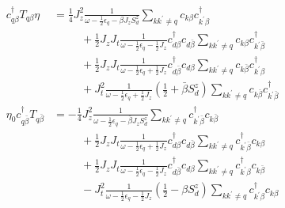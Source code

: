 \documentclass[14pt]{extarticle}
\numberwithin{equation}{section}
\begin{document}
\begin{align}
  c^{\dag}_{q\beta}T_{q\beta}\eta  &=  \frac{1}{4} J_z^2 \frac{1}{\omega - \frac{1}{2} \epsilon_q - \beta J_zS_d^z}  \sum\limits_{kk^{\prime}\ne q} c_{k\beta}c^{\dag}_{k^{\prime}\beta} \nonumber\\
&\hspace{30pt} + \frac{1}{2} J_z J_t\frac{1}{\omega - \frac{1}{2}\epsilon_q - \frac{1}{2}J_z}  c^{\dag}_{d\beta} c_{d\bar{\beta}} \sum\limits_{kk^{\prime}\ne q}  c_{k\beta} c^{\dag}_{k^{\prime}\bar{\beta}} \nonumber\\
&\hspace{30pt} +   \frac{1}{2} J_z J_t\frac{1}{\omega - \frac{1}{2}\epsilon_q + \frac{1}{2}J_z} c^{\dag}_{d\bar{\beta}} c_{d\beta} \sum\limits_{kk^{\prime}\ne q}  c_{k\bar{\beta}}  c^{\dag}_{k^{\prime}\beta} \nonumber\\
&\hspace{30pt} + J_t^2 \frac{1}{\omega - \frac{1}{2}\epsilon_q + \frac{1}{2} J_z} \left( \frac{1}{2} + \bar{\beta} S_d^z \right) \sum\limits_{kk^{\prime}\ne q} c_{k\bar{\beta}} c^{\dag}_{k^{\prime}\bar{\beta}} \label{eq:36} \\
  \eta_0 c^{\dag}_{q\bar{\beta}}T_{q\bar{\beta}} &= -\frac{1}{4} J_z^2 \frac{1}{\omega - \frac{1}{2} \epsilon_q -\bar{\beta} J_zS^z_d }  \sum\limits_{kk^{\prime}\ne q} c^{\dag}_{k^{\prime}\bar{\beta}} c_{k\bar{\beta}} \nonumber\\
&\hspace{30pt} + \frac{1}{2} J_z J_t  \frac{1}{\omega- \frac{1}{2}\epsilon_q + \frac{1}{2} J_z} c^{\dag}_{d\beta} c_{d\bar{\beta}} \sum\limits_{kk^{\prime}\ne q}  c^{\dag}_{k^{\prime}\bar{\beta}}c_{k\beta} \nonumber\\
&\hspace{30pt} + \frac{1}{2} J_z J_t  \frac{1}{\omega- \frac{1}{2}\epsilon_q - \frac{1}{2} J_z} c^{\dag}_{d\bar{\beta}} c_{d\beta} \sum\limits_{kk^{\prime}\ne q}  c^{\dag}_{k^{\prime}\beta}c_{k\bar{\beta}} \nonumber\\
&\hspace{30pt} - J_t^2 \frac{1}{\omega- \frac{1}{2}\epsilon_q - \frac{1}{2} J_z} \left( \frac{1}{2} - \beta S_d^z \right) \sum\limits_{kk^{\prime}\ne q} c^{\dag}_{k^{\prime}\beta}c_{k\beta}  \label{eq:37}
\end{align}
\end{document}
